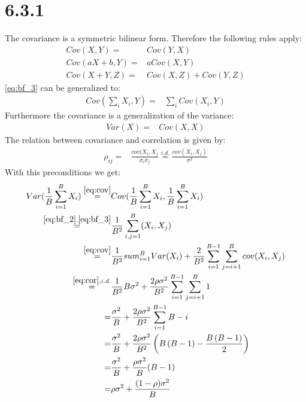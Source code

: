 \documentclass[a4paper,11pt]{article}
\theoremstyle{definition}
\theoremstyle{plain}
\theoremstyle{remark}
\begin{document}
\section*{6.3.1}
The covariance is a symmetric bilinear form. Therefore the following rules apply:
\begin{align}
Cov(X,Y) =& Cov(Y,X) \label{eq:bf_1} \\
Cov(aX+b,Y) =& aCov(X,Y) \label{eq:bf_2} \\
Cov(X+Y,Z) =& Cov(X,Z)+Cov(Y,Z) \label{eq:bf_3}
\end{align}
\ref{eq:bf_3} can be generalized to:
\begin{align}
Cov(\sum_iX_i, Y) =& \sum_iCov(X_i,Y) \label{eq:bf_4}
\end{align}
Furthermore the covariance is a generalization of the variance:
\begin{align}
Var(X) =& Cov(X,X) \label{eq:cov}
\end{align}
The relation between covariance and correlation is given by:
\begin{align}
\rho_{ij} =& \frac{cov(X_i,X_j}{\sigma_i\sigma_j} \overset{i.d.}{=} \frac{cov(X_i,X_j)}{\sigma^2} \label{eq:cor}
\end{align}
With this preconditions we get:
\begin{align}
Var(\frac{1}{B}\sum_{i=1}^BX_i) \overset{\ref{eq:cov}}{=}& Cov(\frac{1}{B}\sum_{i=1}^BX_i,\frac{1}{B}\sum_{i=1}^BX_i) \\
  \overset{\ref{eq:bf_2}, \ref{eq:bf_3}}{=}&\frac{1}{B^2}\sum_{i,j=1}^B(X_i,X_j) \\
  \overset{\ref{eq:cov}}{=}&\frac{1}{B^2}sum_{i=1}^BVar(X_i)+\frac{2}{B^2}\sum_{i=1}^{B-1}\sum_{j=i+1}^Bcov(X_i,X_j) \\
  \overset{\ref{eq:cor}, i.d.}{=}&\frac{1}{B^2}B\sigma^2+\frac{2\rho\sigma^2}{B^2}\sum_{i=1}^{B-1}\sum_{j=i+1}^B1 \\
  =&\frac{\sigma^2}{B}+\frac{2\rho\sigma^2}{B^2}\sum_{i=1}^{B-1}B-i \\
  =&\frac{\sigma^2}{B}+\frac{2\rho\sigma^2}{B^2}\left(B\left(B-1\right) - \frac{B\left(B-1\right)}{2}\right) \\
  =&\frac{\sigma^2}{B}+\frac{\rho\sigma^2}{B}(B-1) \\
  =&\rho\sigma^2+\frac{(1-\rho)\sigma^2}{B}
\end{align} 
\end{document}
